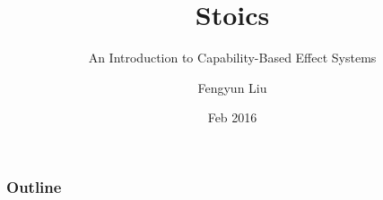 \documentclass[aspectratio=169]{beamer}
\title{Stoics}
\subtitle{An Introduction to Capability-Based Effect Systems}
\author{Fengyun Liu}
\institute{School of Communication and Computer Sciences}
\date{Feb 2016}
\begin{document}
\begin{frame}
\titlepage
\end{frame}

\begin{frame}
\frametitle{Outline}
\tableofcontents
\end{frame}


\end{document}
